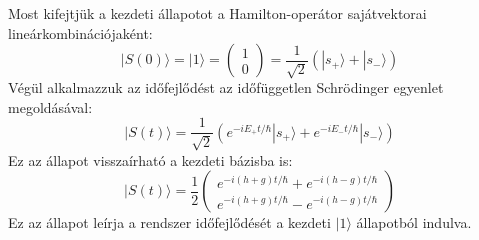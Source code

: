 \documentclass[../main.tex]{subfiles}
\begin{document}
Most kifejtjük a kezdeti állapotot a Hamilton-operátor sajátvektorai lineárkombinációjaként:
\begin{equation}
    |S(0)\rangle = |1\rangle =
    \begin{pmatrix}
        1 \\
        0
    \end{pmatrix} =
    \frac{1}{\sqrt{2}} (|s_+ \rangle + |s_- \rangle)
\end{equation}
Végül alkalmazzuk az időfejlődést az időfüggetlen Schrödinger egyenlet megoldásával:
\begin{equation}
    |S(t)\rangle = \frac{1}{\sqrt{2}} (e^{-i E_+ t / \hbar} |s_+ \rangle + e^{-i E_- t / \hbar} |s_- \rangle)
\end{equation}
Ez az állapot visszaírható a kezdeti bázisba is:
\begin{equation}
    |S(t)\rangle = \frac{1}{2}
    \begin{pmatrix}
        e^{-i (h + g) t / \hbar} + e^{-i (h - g) t / \hbar} \\
        e^{-i (h + g) t / \hbar} - e^{-i (h - g) t / \hbar}
    \end{pmatrix}
\end{equation}
Ez az állapot leírja a rendszer időfejlődését a kezdeti $|1\rangle$ állapotból indulva.
\end{document}
